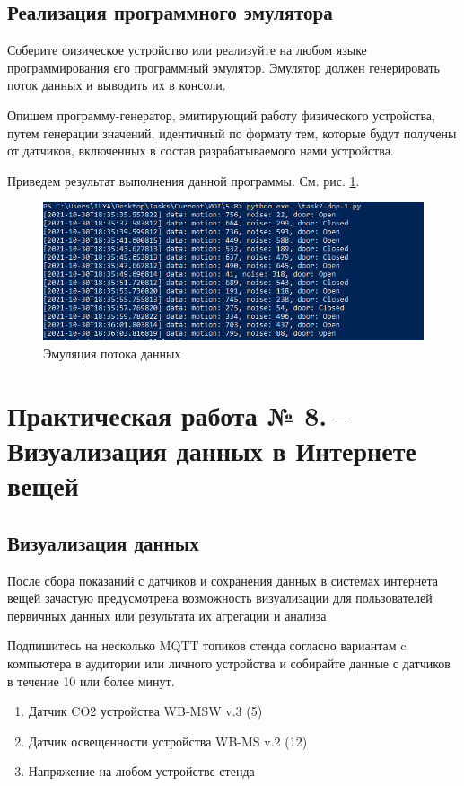 \documentclass[a4paper,14pt]{extarticle}
\begin{document}
\subsection{Реализация программного эмулятора}
\begin{problem}
	Соберите физическое устройство или реализуйте на любом языке программирования его
	программный эмулятор. Эмулятор должен генерировать поток данных и выводить их в
	консоли.
	
	\nonum Опишем программу-генератор, эмитирующий работу физического устройства, путем генерации значений, идентичный по формату тем, которые будут получены от датчиков, включенных в состав разрабатываемого нами устройства. 
	
	
	
	Приведем результат выполнения данной программы. См. рис. \ref{fig:dop-res-1}.
	
	\begin{figure}[htpb]
		\centering
		\includegraphics[width=0.7\linewidth]{images/dop-res-1}
		\caption{Эмуляция потока данных}
		\label{fig:dop-res-1}
	\end{figure}
\end{problem}

\newpage
\section{Практическая работа № 8. – Визуализация данных в Интернете вещей}
\subsection{Визуализация данных}
После сбора показаний с датчиков и сохранения данных в системах интернета вещей
зачастую предусмотрена возможность визуализации для пользователей первичных данных
или результата их агрегации и анализа

\begin{problem}
Подпишитесь на несколько MQTT топиков стенда согласно вариантам c компьютера
в аудитории или личного устройства и собирайте данные с датчиков в течение 10
или более минут.
\begin{enumerate}
	\item Датчик CO2 устройства WB-MSW v.3 (5)
	\item Датчик освещенности устройства WB-MS v.2 (12)
	\item Напряжение на любом устройстве стенда
\end{enumerate}

\nonum

\end{problem}
\end{document}

